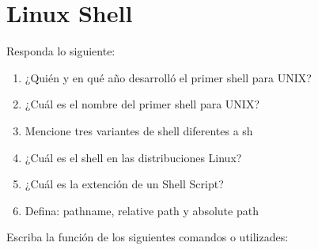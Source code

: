 \section{Linux Shell}

	Responda lo siguiente:

		\begin{enumerate}

			\item ¿Quién y en qué año desarrolló el primer shell para UNIX?
			\item ¿Cuál es el nombre del primer shell para UNIX?
			
			\item Mencione tres variantes de shell diferentes a sh
			\item ¿Cuál es el shell en las distribuciones Linux?
			
			\item ¿Cuál es la extención de un Shell Script?
			
			\item Defina: pathname, relative path y absolute path
			
		\end{enumerate}

	Escriba la funci\'on de los siguientes comandos o utilizades: 
			
